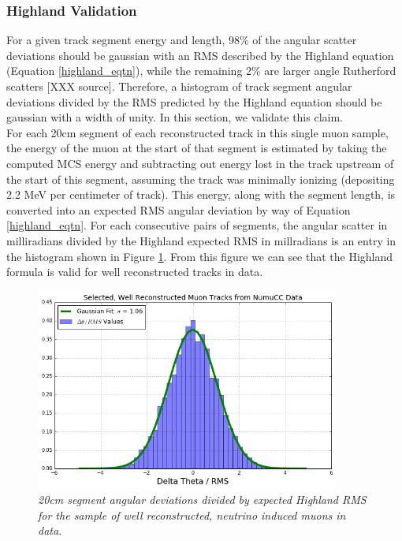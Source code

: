 \subsubsection{Highland Validation}\label{Highland_Validation_DataRecoTrack_section}
For a given track segment energy and length, 98\% of the angular scatter deviations should be gaussian with an RMS described by the Highland equation (Equation \ref{highland_eqtn}), while the remaining 2\% are larger angle Rutherford scatters [XXX source]. Therefore, a histogram of track segment angular deviations divided by the RMS predicted by the Highland equation should be gaussian with a width of unity. In this section, we validate this claim.\\

For each 20cm segment of each reconstructed track in this single muon sample, the energy of the muon at the start of that segment is estimated by taking the computed MCS energy and subtracting out energy lost in the track upstream of the start of this segment, assuming the track was minimally ionizing (depositing 2.2 MeV per centimeter of track). This energy, along with the segment length, is converted into an expected RMS angular deviation by way of Equation \ref{highland_eqtn}. For each consecutive pairs of segments, the angular scatter in milliradians divided by the Highland expected RMS in millradians is an entry in the histogram shown in Figure \ref{Highland_validation_DataRecoTracks_fig}. From this figure we can see that the Highland formula is valid for well reconstructed tracks in data.

\begin{figure}[h!]
\begin{center}
\includegraphics[width=100mm]{Figures/Highland_validation_DataRecoTracks_goodhandscan.png}
\end{center}
\caption{\textit{20cm segment angular deviations divided by expected Highland RMS for the sample of well reconstructed, neutrino induced muons in {\ub} data.}}
\label{Highland_validation_DataRecoTracks_fig}
\end{figure}

